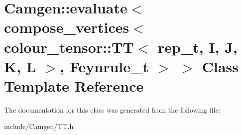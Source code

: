 \hypertarget{a00175}{}\section{Camgen\+:\+:evaluate$<$ compose\+\_\+vertices$<$ colour\+\_\+tensor\+:\+:T\+T$<$ rep\+\_\+t, I, J, K, L $>$, Feynrule\+\_\+t $>$ $>$ Class Template Reference}
\label{a00175}


The documentation for this class was generated from the following file\+:\begin{DoxyCompactItemize}
\item 
include/\+Camgen/T\+T.\+h\end{DoxyCompactItemize}
